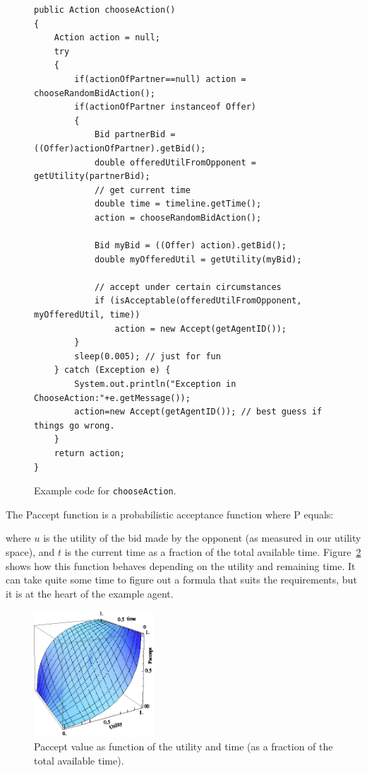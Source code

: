 \documentclass[]{article}
\begin{document}
{\begin{figure}[htb]
\begin{lstlisting}
public Action chooseAction()
{
	Action action = null;
	try 
	{ 
		if(actionOfPartner==null) action = chooseRandomBidAction();
		if(actionOfPartner instanceof Offer)
		{
			Bid partnerBid = ((Offer)actionOfPartner).getBid();
			double offeredUtilFromOpponent = getUtility(partnerBid);
			// get current time
			double time = timeline.getTime();
			action = chooseRandomBidAction();
			
			Bid myBid = ((Offer) action).getBid();
			double myOfferedUtil = getUtility(myBid);
			
			// accept under certain circumstances
			if (isAcceptable(offeredUtilFromOpponent, myOfferedUtil, time))
				action = new Accept(getAgentID());
		}
		sleep(0.005); // just for fun
	} catch (Exception e) { 
		System.out.println("Exception in ChooseAction:"+e.getMessage());
		action=new Accept(getAgentID()); // best guess if things go wrong. 
	}
	return action;
}
\end{lstlisting}
\caption{Example code for \texttt{chooseAction}.}\label{Code:chooseAction}
\end{figure}

The Paccept function is a probabilistic acceptance function where P equals:

\begin{equation}
\end{equation}
where $u$ is the utility of the bid made by the opponent (as measured in our utility space), and $t$ is the current time as a fraction of the total available time. 
Figure~\ref{Fig:Paccept} shows how this function behaves depending on the utility and remaining time. It can take quite some time to figure out a formula that suits the requirements, but it is at the heart of the example agent.

\begin{figure}[htb]
	\centering
	\includegraphics[width=0.4\textwidth]{media/image21.png}
\caption{Paccept value as function of the utility and time (as a fraction of the total available time).}\label{Fig:Paccept}
\end{figure}
 
}
\end{document}
